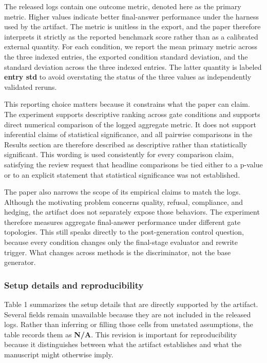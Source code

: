 \documentclass{article}
\begin{document}
\label{sec:logged_metric_and_reporting_protocol}

The released logs contain one outcome metric, denoted here as the primary metric. Higher values indicate better final-answer performance under the harness used by the artifact. The metric is unitless in the export, and the paper therefore interprets it strictly as the reported benchmark score rather than as a calibrated external quantity. For each condition, we report the mean primary metric across the three indexed entries, the exported condition standard deviation, and the standard deviation across the three indexed entries. The latter quantity is labeled \textbf{entry std} to avoid overstating the status of the three values as independently validated reruns.

This reporting choice matters because it constrains what the paper can claim. The experiment supports descriptive ranking across gate conditions and supports direct numerical comparison of the logged aggregate metric. It does not support inferential claims of statistical significance, and all pairwise comparisons in the Results section are therefore described as descriptive rather than statistically significant. This wording is used consistently for every comparison claim, satisfying the review request that headline comparisons be tied either to a p-value or to an explicit statement that statistical significance was not established.

The paper also narrows the scope of its empirical claims to match the logs. Although the motivating problem concerns quality, refusal, compliance, and hedging, the artifact does not separately expose those behaviors. The experiment therefore measures aggregate final-answer performance under different gate topologies. This still speaks directly to the post-generation control question, because every condition changes only the final-stage evaluator and rewrite trigger. What changes across methods is the discriminator, not the base generator.

\subsubsection{Setup details and reproducibility}

\label{sec:setup_details_and_reproducibility}

Table 1 summarizes the setup details that are directly supported by the artifact. Several fields remain unavailable because they are not included in the released logs. Rather than inferring or filling those cells from unstated assumptions, the table records them as \textbf{N/A}. This revision is important for reproducibility because it distinguishes between what the artifact establishes and what the manuscript might otherwise imply.
\end{document}
